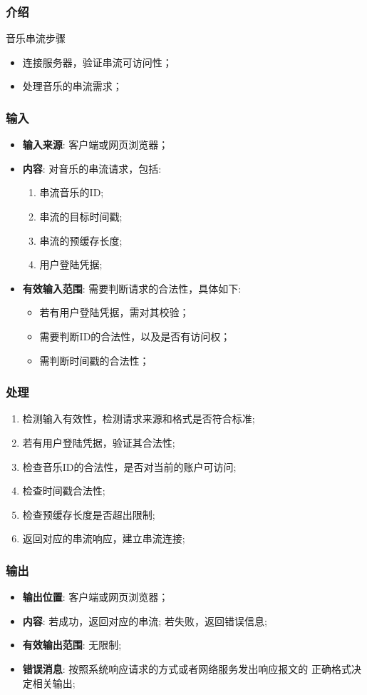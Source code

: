 \subsubsection{介绍}
	音乐串流步骤
	\begin{itemize}
		\item 连接服务器，验证串流可访问性；
		\item 处理音乐的串流需求；
	\end{itemize}
\subsubsection{输入}
	\begin{itemize}
		\item \textbf{输入来源}: 客户端或网页浏览器；
		\item \textbf{内容}: 对音乐的串流请求，包括: 
		\begin{enumerate}
			\item 串流音乐的ID;
			\item 串流的目标时间戳;
			\item 串流的预缓存长度;
			\item 用户登陆凭据;
		\end{enumerate}
		\item \textbf{有效输入范围}: 需要判断请求的合法性，具体如下: 
		\begin{itemize}
			\item 若有用户登陆凭据，需对其校验； 
			\item 需要判断ID的合法性，以及是否有访问权；
			\item 需判断时间戳的合法性； 
		\end{itemize}
	\end{itemize}
\subsubsection{处理}
	\begin{enumerate}
		\item 检测输入有效性，检测请求来源和格式是否符合标准;
		\item 若有用户登陆凭据，验证其合法性;
		\item 检查音乐ID的合法性，是否对当前的账户可访问;
		\item 检查时间戳合法性;
		\item 检查预缓存长度是否超出限制;
		\item 返回对应的串流响应，建立串流连接;
	\end{enumerate}
\subsubsection{输出}
\begin{itemize}
	\item \textbf{输出位置}: 客户端或网页浏览器；
	\item \textbf{内容}: 若成功，返回对应的串流; 若失败，返回错误信息;
	\item \textbf{有效输出范围}: 无限制;
	\item \textbf{错误消息}: 按照系统响应请求的方式或者网络服务发出响应报文的
		正确格式决定相关输出;
\end{itemize}


